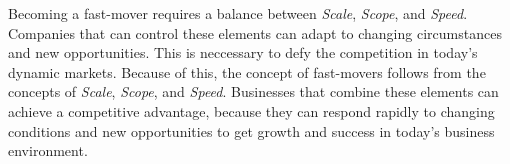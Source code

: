 \documentclass[a4]{scrartcl}
\begin{document}
Becoming a fast-mover requires a balance between \textit{Scale}, \textit{Scope}, and \textit{Speed}. Companies that can control these elements can adapt to changing circumstances and new opportunities. This is neccessary to defy the competition in today's dynamic markets.
Because of this, the concept of fast-movers follows from the concepts of  \textit{Scale}, \textit{Scope}, and \textit{Speed}. Businesses that combine these elements can achieve a competitive advantage, because they can respond rapidly to changing conditions and new opportunities to get growth and success in today's business environment.


	
	
	
	
	
	
	

	
	
\end{document}

